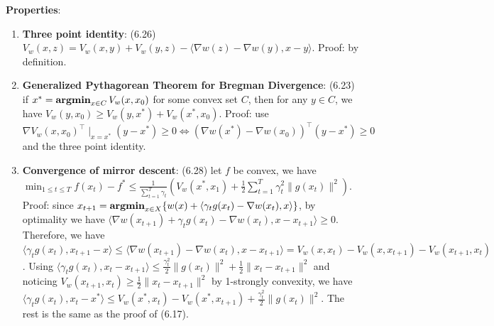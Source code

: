 \textbf{Properties}:
\begin{enumerate}
    \item \textbf{Three point identity}: (6.26) $V_w(x, z) = V_w(x, y) + V_w(y, z) - \langle \nabla w(z) - \nabla w(y), x-y \rangle$. Proof: by definition.
    \item \textbf{Generalized Pythagorean Theorem for Bregman Divergence}: (6.23) if $x^* = \operatorname{\textbf{argmin}}_{x \in C} V_w(x, x_0)$ for some convex set $C$, then for any $y \in C$, we have $V_w(y, x_0) \ge V_w(y, x^*) + V_w(x^*, x_0)$. Proof: use $\nabla V_w(x, x_0)^\top \mid_{x=x^*} (y-x^*) \ge 0 \Leftrightarrow (\nabla w(x^*) - \nabla w(x_0))^\top (y-x^*) \ge 0$ and the three point identity.
    \item \textbf{Convergence of mirror descent}: (6.28) let $f$ be convex, we have $\min_{1 \le t \le T}f(x_t) - f^* \le \frac{1}{\sum_{t=1}^T \gamma_t} (V_w(x^*, x_1) + \frac{1}{2}\sum_{t=1}^T \gamma_t^2 \|g(x_t)\|^2)$. Proof: since $x_{t+1} =  \operatorname{\textbf{argmin}}_{x\in X}\{w(x)+\langle \gamma_t g(x_t)-\nabla w(x_t), x\rangle\}$, by optimality we have $\langle \nabla w(x_{t+1}) + \gamma_t g(x_t) - \nabla w(x_t), x-x_{t+1}\rangle \ge 0$. Therefore, we have $\langle \gamma_t g(x_t), x_{t+1} -x \rangle \le \langle \nabla w(x_{t+1}) - \nabla w(x_t), x-x_{t+1} \rangle = V_w(x, x_t) - V_w(x, x_{t+1}) - V_w(x_{t+1}, x_t)$. Using $\langle \gamma_t g(x_t), x_t - x_{t+1}\rangle \le \frac{\gamma_t^2}{2}\|g(x_t)\|^2 + \frac{1}{2}\|x_t - x_{t+1}\|^2$ and noticing $V_w(x_{t+1}, x_t) \ge \frac{1}{2}\|x_t - x_{t+1}\|^2$ by 1-strongly convexity, we have $\langle \gamma_t g(x_t), x_t - x^* \rangle \le V_w(x^*, x_t) - V_w(x^*, x_{t+1}) + \frac{\gamma_t^2}{2}\|g(x_t)\|^2$. The rest is the same as the proof of (6.17).
\end{enumerate}

